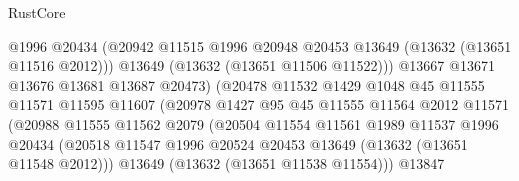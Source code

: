 \begin{lexlean}{RustCore}
\begin{coremodule}
                                      @1996
                                      @20434
                                      (@20942
                                        @11515
                                        @1996
                                        @20948
                                        @20453
                                        @13649
                                        (@13632 (@13651 @11516 @2012)))
                                      @13649
                                      (@13632 (@13651 @11506 @11522)))
                                    @13667
                                    @13671
                                    @13676
                                    @13681
                                    @13687
                                    @20473)
                                  (@20478
                                    @11532
                                    @1429
                                    @1048
                                    @45
                                    @11555
                                    @11571
                                    @11595
                                    @11607
                                    (@20978
                                      @1427
                                      @95
                                      @45
                                      @11555
                                      @11564
                                      @2012
                                      @11571
                                      (@20988
                                        @11555
                                        @11562
                                        @2079
                                        (@20504
                                          @11554
                                          @11561
                                          @1989
                                          @11537
                                          @1996
                                          @20434
                                          (@20518
                                            @11547
                                            @1996
                                            @20524
                                            @20453
                                            @13649
                                            (@13632 (@13651 @11548 @2012)))
                                          @13649
                                          (@13632 (@13651 @11538 @11554)))
                                        @13847

\end{coremodule}
\end{lexlean}
